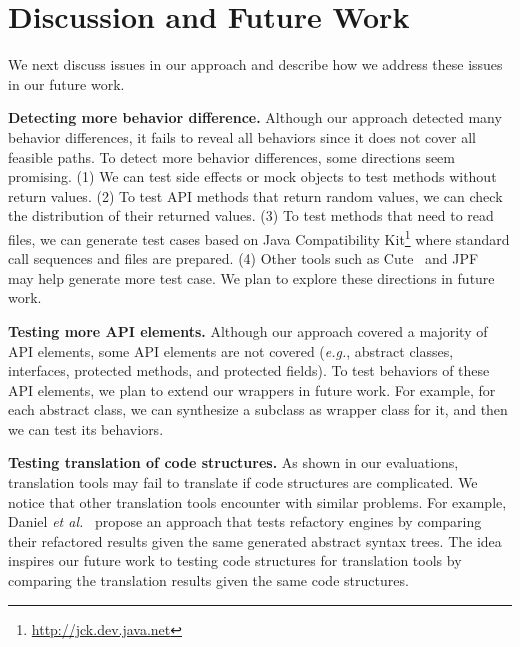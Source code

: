 

\section{Discussion and Future Work}
\label{sec:discuss}

We next discuss issues in our approach and describe how we address
these issues in our future work.

\textbf{Detecting more behavior difference.} Although our approach detected many behavior differences, it fails to reveal all behaviors since it does not cover all feasible paths. To detect more behavior differences, some directions seem promising. (1) We can test side effects or  mock objects to test methods without return values. (2) To test API methods that return random values, we can check the distribution of their returned values. (3) To test methods that need to read files, we can generate test cases based on Java Compatibility Kit\footnote{\url{http://jck.dev.java.net}} where standard call sequences and files are prepared. (4) Other tools such as Cute~\cite{koushik:cute} and JPF~\cite{visser2003mcp} may help generate more test case. We plan to explore these directions in future work.

\textbf{Testing more API elements.} Although our approach covered a majority of API elements, some API elements are not covered (\emph{e.g.}, abstract classes, interfaces, protected methods, and protected fields). To test behaviors of these API elements, we plan to extend our wrappers in future work. For example, for each abstract class, we can synthesize a subclass as wrapper class for it, and then we can test its behaviors.

\textbf{Testing translation of code structures.} As shown in our evaluations, translation tools may fail to translate if code structures are complicated. We notice that other translation tools encounter with similar problems. For example, Daniel \emph{et al.}~\cite{daniel2007automated} propose an approach that tests refactory engines by comparing their refactored results given the same generated abstract syntax trees. The idea inspires our future work to testing code structures for translation tools by comparing the translation results given the same code structures.

